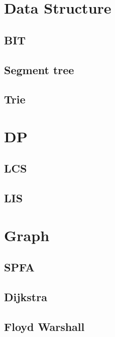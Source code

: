 \section{Data Structure}
        \subsection{BIT}
                
        \subsection{Segment tree}
                
        \subsection{Trie}
                

\section{DP}
        \subsection{LCS}
                
        \subsection{LIS}
                  

\section{Graph}
        \subsection{SPFA}
                
        \subsection{Dijkstra}
                
        \subsection{Floyd Warshall}
                
